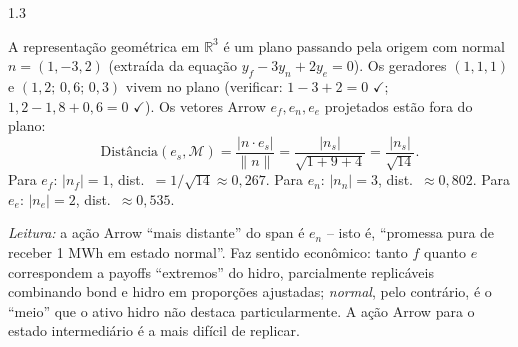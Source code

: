 \documentclass[11pt,addpoints]{exam}
\begin{document}
\begin{spacing}{1.3}
\begin{questions}
\begin{parts}
\begin{solution}
A representação geométrica em $\mathbb{R}^3$ é um plano passando pela origem com normal $n = (1, -3, 2)$ (extraída da equação $y_f - 3 y_n + 2 y_e = 0$). Os geradores $(1,1,1)$ e $(1{,}2;\,0{,}6;\,0{,}3)$ vivem no plano (verificar: $1 - 3 + 2 = 0$ $\checkmark$; $1{,}2 - 1{,}8 + 0{,}6 = 0$ $\checkmark$). Os vetores Arrow $e_f, e_n, e_e$ projetados estão fora do plano:
\[
    \text{Distância}(e_s, \mathcal{M}) = \frac{|n \cdot e_s|}{\|n\|} = \frac{|n_s|}{\sqrt{1 + 9 + 4}} = \frac{|n_s|}{\sqrt{14}}.
\]
Para $e_f$: $|n_f| = 1$, dist.\ $= 1/\sqrt{14} \approx 0{,}267$. Para $e_n$: $|n_n| = 3$, dist.\ $\approx 0{,}802$. Para $e_e$: $|n_e| = 2$, dist.\ $\approx 0{,}535$.

\emph{Leitura:} a ação Arrow ``mais distante'' do span é $e_n$ -- isto é, ``promessa pura de receber 1 MWh em estado normal''. Faz sentido econômico: tanto $f$ quanto $e$ correspondem a payoffs ``extremos'' do hidro, parcialmente replicáveis combinando bond e hidro em proporções ajustadas; \emph{normal}, pelo contrário, é o ``meio'' que o ativo hidro não destaca particularmente. A ação Arrow para o estado intermediário é a mais difícil de replicar.

\begin{center}
\end{center}


\end{solution}
\end{parts}
\end{questions}
\end{spacing}
\end{document}
